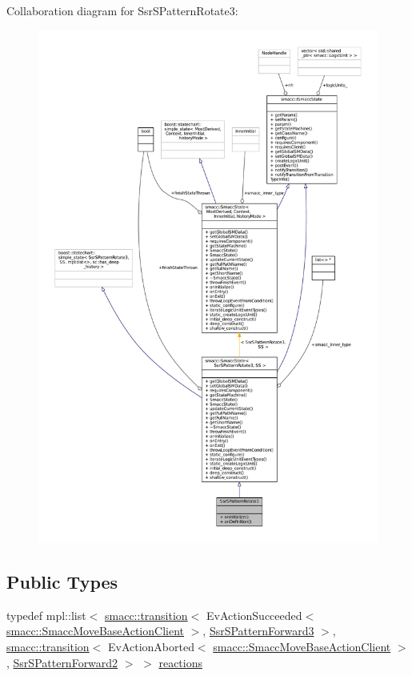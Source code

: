 Collaboration diagram for Ssr\+S\+Pattern\+Rotate3\+:
\nopagebreak
\begin{figure}[H]
\begin{center}
\leavevmode
\includegraphics[width=350pt]{structSsrSPatternRotate3__coll__graph}
\end{center}
\end{figure}
\subsection*{Public Types}
\begin{DoxyCompactItemize}
\item 
typedef mpl\+::list$<$ \hyperlink{classsmacc_1_1transition}{smacc\+::transition}$<$ Ev\+Action\+Succeeded$<$ \hyperlink{classsmacc_1_1SmaccMoveBaseActionClient}{smacc\+::\+Smacc\+Move\+Base\+Action\+Client} $>$, \hyperlink{structSsrSPatternForward3}{Ssr\+S\+Pattern\+Forward3} $>$, \hyperlink{classsmacc_1_1transition}{smacc\+::transition}$<$ Ev\+Action\+Aborted$<$ \hyperlink{classsmacc_1_1SmaccMoveBaseActionClient}{smacc\+::\+Smacc\+Move\+Base\+Action\+Client} $>$, \hyperlink{structSsrSPatternForward2}{Ssr\+S\+Pattern\+Forward2} $>$ $>$ \hyperlink{structSsrSPatternRotate3_ac0a1840dc4d2ddc813d76475ddf7a082}{reactions}
\end{DoxyCompactItemize}
